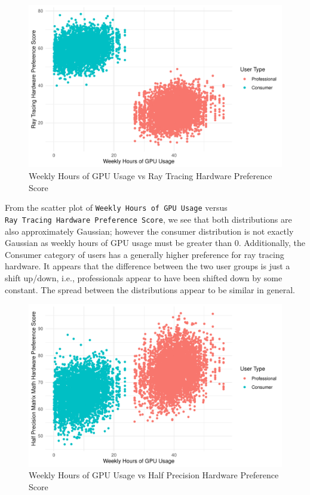 \documentclass[
]{article}
\begin{document}
\begin{figure}

{\centering \includegraphics[width=0.6\linewidth,]{Assignment1_files/figure-latex/unnamed-chunk-7-1} 

}

\caption{Weekly Hours of GPU Usage vs Ray Tracing Hardware Preference Score}\label{fig:unnamed-chunk-7}
\end{figure}

From the scatter plot of \texttt{Weekly\ Hours\ of\ GPU\ Usage} versus
\texttt{Ray\ Tracing\ Hardware\ Preference\ Score}, we see that both
distributions are also approximately Gaussian; however the consumer
distribution is not exactly Gaussian as weekly hours of GPU usage must
be greater than 0. Additionally, the Consumer category of users has a
generally higher preference for ray tracing hardware. It appears that
the difference between the two user groups is just a shift up/down,
i.e., professionals appear to have been shifted down by some constant.
The spread between the distributions appear to be similar in general.

\begin{figure}

{\centering \includegraphics[width=0.6\linewidth,]{Assignment1_files/figure-latex/unnamed-chunk-8-1} 

}

\caption{Weekly Hours of GPU Usage vs Half Precision Hardware Preference Score}\label{fig:unnamed-chunk-8}
\end{figure}
\end{document}
